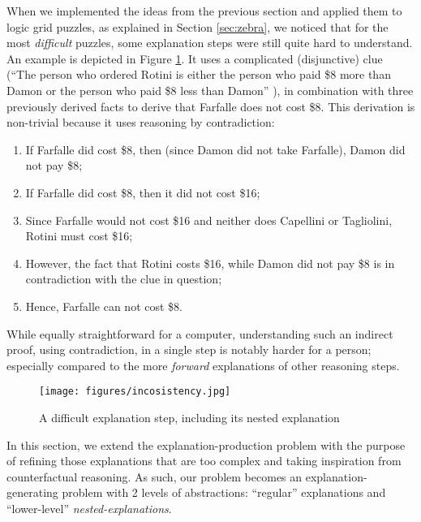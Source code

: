 When we implemented the ideas from the previous section and applied them to logic grid puzzles, as explained in Section \ref{sec:zebra}, we noticed that 
for the most \textit{difficult} puzzles, some explanation steps were still quite hard to understand.
An example is depicted in Figure \ref{fig:pasta_diff}.
It uses a complicated (disjunctive) clue (``The person who ordered Rotini is either the person who paid \$8 more than Damon or the person who paid \$8 less than Damon'' ), in combination with three previously derived facts to derive that Farfalle does not cost \$8.
This derivation is non-trivial because it uses reasoning by contradiction:
 \begin{enumerate}
  \item If Farfalle did cost \$8, then (since Damon did not take Farfalle), Damon did not pay \$8;
  \item If Farfalle did cost \$8, then it did not cost \$16; 
  \item Since Farfalle would not cost \$16 and neither does Capellini or Tagliolini, Rotini must cost \$16;
  \item However, the fact that Rotini costs \$16, while Damon did not pay \$8 is in contradiction with the clue in question;
  \item Hence, Farfalle can not cost \$8.
 \end{enumerate}
 While equally straightforward for a computer, understanding such an indirect proof, using contradiction, in a single step is notably harder for a person; especially compared to the more \textit{forward} explanations of other reasoning steps.
\begin{figure}[t!]
    \texttt{[image: figures/incosistency.jpg]}
    \caption{A difficult explanation step, including its nested explanation}\label{fig:pasta_diff}
\end{figure}

In this section, we extend the explanation-production problem with the purpose of refining those explanations that are too complex and taking inspiration from counterfactual reasoning.
As such, our problem becomes an explanation-generating problem with 2 levels of abstractions: ``regular'' explanations and ``lower-level'' \textit{nested-explanations}. 

